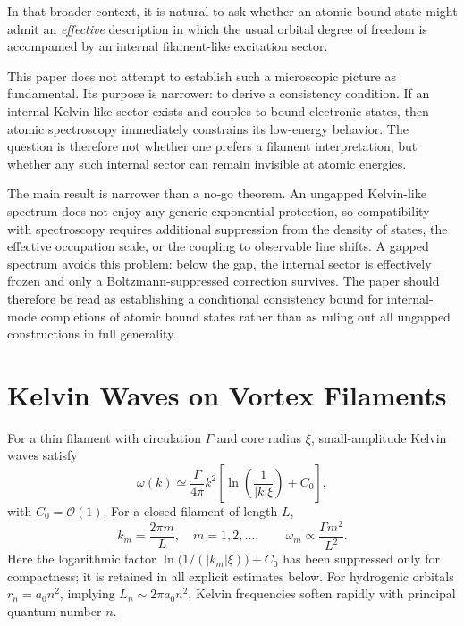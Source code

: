 \documentclass[pdflatex,sn-mathphys-num]{sn-jnl}
\begin{document}
        In that broader context, it is natural to ask whether an atomic bound state might admit an \emph{effective} description in which the usual orbital degree of freedom is accompanied by an internal filament-like excitation sector.

        This paper does not attempt to establish such a microscopic picture as fundamental. Its purpose is narrower: to derive a consistency condition. If an internal Kelvin-like sector exists and couples to bound electronic states, then atomic spectroscopy immediately constrains its low-energy behavior. The question is therefore not whether one prefers a filament interpretation, but whether any such internal sector can remain invisible at atomic energies.

        The main result is narrower than a no-go theorem. An ungapped Kelvin-like spectrum does not enjoy any generic exponential protection, so compatibility with spectroscopy requires additional suppression from the density of states, the effective occupation scale, or the coupling to observable line shifts. A gapped spectrum avoids this problem: below the gap, the internal sector is effectively frozen and only a Boltzmann-suppressed correction survives. The paper should therefore be read as establishing a conditional consistency bound for internal-mode completions of atomic bound states rather than as ruling out all ungapped constructions in full generality.

    \section{Kelvin Waves on Vortex Filaments}\label{sec:kelvin}
        For a thin filament with circulation $\Gamma$ and core radius $\xi$, small-amplitude Kelvin waves satisfy \cite{LordKelvin1880,Barenghi2014}
        \begin{equation}
            \omega(k) \simeq \frac{\Gamma}{4\pi} k^2
            \left[
                \ln\!\left(\frac{1}{|k|\xi}\right) + C_0
            \right],
            \label{eq:kelvin_dispersion}
        \end{equation}
        with $C_0=\mathcal{O}(1)$. For a closed filament of length $L$,
        \begin{equation}
            k_m = \frac{2\pi m}{L}, \quad m=1,2,\dots,\qquad
            \omega_m \propto \frac{\Gamma m^2}{L^2}.
        \end{equation}
        Here the logarithmic factor $\ln\!\bigl(1/(|k_m|\xi)\bigr)+C_0$ has been suppressed only for compactness; it is retained in all explicit estimates below.
        For hydrogenic orbitals $r_n=a_0 n^2$, implying $L_n\sim 2\pi a_0 n^2$, Kelvin frequencies soften rapidly with principal quantum number $n$.
\end{document}
